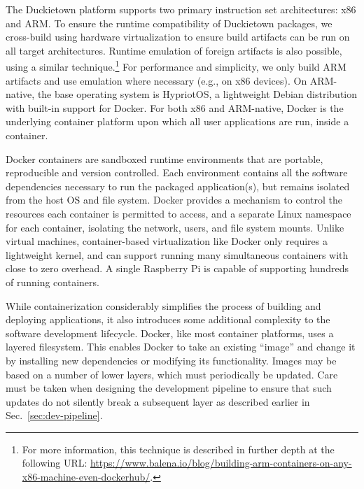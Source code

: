 \documentclass[12pt,initial,twoside,maitrise]{dms}
\numberwithin{equation}{section}
\numberwithin{table}{chapter}
\numberwithin{figure}{chapter}
\begin{document}
The Duckietown platform supports two primary instruction set architectures: x86 and ARM. To ensure the runtime compatibility of Duckietown packages, we cross-build using hardware virtualization to ensure build artifacts can be run on all target architectures. Runtime emulation of foreign artifacts is also possible, using a similar technique.\footnote{For more information, this technique is described in further depth at the following URL: \url{https://www.balena.io/blog/building-arm-containers-on-any-x86-machine-even-dockerhub/}.} For performance and simplicity, we only build ARM artifacts and use emulation where necessary (e.g., on x86 devices). On ARM-native, the base operating system is HypriotOS, a lightweight Debian distribution with built-in support for Docker. For both x86 and ARM-native, Docker is the underlying container platform upon which all user applications are run, inside a container.

Docker containers are sandboxed runtime environments that are portable, reproducible and version controlled. Each environment contains all the software dependencies necessary to run the packaged application(s), but remains isolated from the host OS and file system. Docker provides a mechanism to control the resources each container is permitted to access, and a separate Linux namespace for each container, isolating the network, users, and file system mounts. Unlike virtual machines, container-based virtualization like Docker only requires a lightweight kernel, and can support running many simultaneous containers with close to zero overhead. A single Raspberry Pi is capable of supporting hundreds of running containers.

While containerization considerably simplifies the process of building and deploying applications, it also introduces some additional complexity to the software development lifecycle. Docker, like most container platforms, uses a layered filesystem. This enables Docker to take an existing ``image'' and change it by installing new dependencies or modifying its functionality. Images may be based on a number of lower layers, which must periodically be updated. Care must be taken when designing the development pipeline to ensure that such updates do not silently break a subsequent layer as described earlier in Sec.~\ref{sec:dev-pipeline}.
\end{document}
